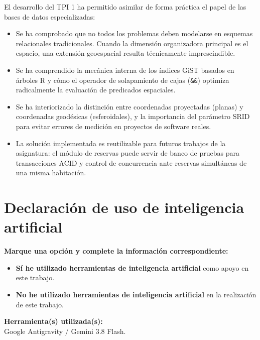 \documentclass[a4paper,12pt]{article}
\begin{document}
El desarrollo del TPI 1 ha permitido asimilar de forma práctica el papel de las bases de datos especializadas:
\begin{itemize}[leftmargin=1.0cm]
  \item Se ha comprobado que no todos los problemas deben modelarse en esquemas relacionales tradicionales. Cuando la dimensión organizadora principal es el espacio, una extensión geoespacial resulta técnicamente imprescindible.
  \item Se ha comprendido la mecánica interna de los índices GiST basados en árboles R y cómo el operador de solapamiento de cajas (\texttt{\&\&}) optimiza radicalmente la evaluación de predicados espaciales.
  \item Se ha interiorizado la distinción entre coordenadas proyectadas (planas) y coordenadas geodésicas (esferoidales), y la importancia del parámetro SRID para evitar errores de medición en proyectos de software reales.
  \item La solución implementada es reutilizable para futuros trabajos de la asignatura: el módulo de reservas puede servir de banco de pruebas para transacciones ACID y control de concurrencia ante reservas simultáneas de una misma habitación.
\end{itemize}

\section{Declaración de uso de inteligencia artificial}

\textbf{Marque una opción y complete la información correspondiente:}

\begin{itemize}[label=$\square$,leftmargin=1.2cm]
  \item[\color{LoyolaBlue}$\blacksquare$] \textbf{Sí he utilizado herramientas de inteligencia artificial} como apoyo en este trabajo.
  \item[$\square$] \textbf{No he utilizado herramientas de inteligencia artificial} en la realización de este trabajo.
\end{itemize}

\textbf{Herramienta(s) utilizada(s):} \\
Google Antigravity / Gemini 3.8 Flash.
\end{document}
